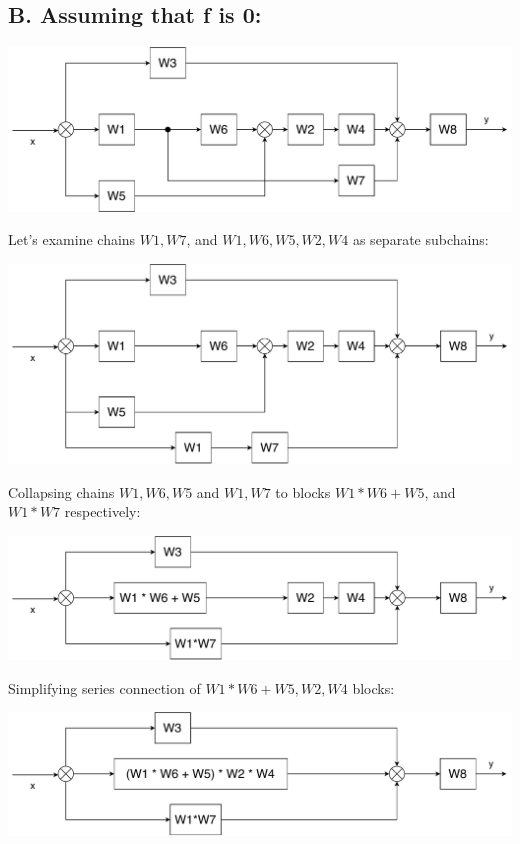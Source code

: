 \documentclass[a4paper,12pt]{article}
\begin{document}
    \subsection*{B. Assuming that f is 0:}
    \begin{center}
        \includegraphics[width=\linewidth]{../Task5/T5Step4.pdf}
    \end{center}
    Let's examine chains $W1, W7$, and $W1, W6, W5, W2, W4$ as separate 
    subchains:
    \begin{center}
        \includegraphics[width=\linewidth]{../Task5/T5Step5.pdf}
    \end{center}
    Collapsing chains $W1,W6,W5$ and $W1, W7$  to blocks $W1 * W6 + W5$, and 
    $W1 * W7$ respectively: 
    \begin{center}
        \includegraphics[width=\linewidth]{../Task5/T5Step6.pdf}
    \end{center}
    Simplifying series connection of $W1 * W6 + W5, W2, W4$ blocks:
    \begin{center}
        \includegraphics[width=\linewidth]{../Task5/T5Step7.pdf}
    \end{center}
\end{document}
